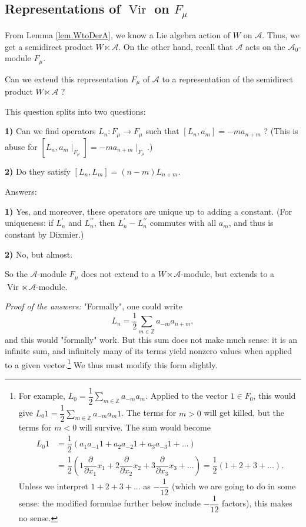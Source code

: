 \documentclass
[numbers=enddot,12pt,final,onecolumn,german,notitlepage]{scrartcl}%
\theoremstyle{definition}
\begin{document}
\subsection{Representations of $\operatorname*{Vir}$ on $F_{\mu}$}

From Lemma \ref{lem.WtoDerA}, we know a Lie algebra action of $W$ on
$\mathcal{A}$. Thus, we get a semidirect product $W\ltimes\mathcal{A}$. On the
other hand, recall that $\mathcal{A}$ acts on the $\mathcal{A}_{0}$-module
$F_{\mu}$.

Can we extend this representation $F_{\mu}$ of $\mathcal{A}$ to a
representation of the semidirect product $W\ltimes\mathcal{A}$ ?

This question splits into two questions:

\textbf{1)} Can we find operators $L_{n}:F_{\mu}\rightarrow F_{\mu}$ such that
$\left[  L_{n},a_{m}\right]  =-ma_{n+m}$ ? (This is abuse for $\left[
L_{n},a_{m}\mid_{F_{\mu}}\right]  =-ma_{n+m}\mid_{F_{\mu}}$.)

\textbf{2)} Do they satisfy $\left[  L_{n},L_{m}\right]  =\left(  n-m\right)
L_{n+m}$.

Answers:

\textbf{1)} Yes, and moreover, these operators are unique up to adding a
constant. (For uniqueness: if $L_{n}^{\prime}$ and $L_{n}^{\prime\prime}$,
then $L_{n}^{\prime}-L_{n}^{\prime\prime}$ commutes with all $a_{m}$, and thus
is constant by Dixmier.)

\textbf{2)} No, but almost.

So the $\mathcal{A}$-module $F_{\mu}$ does not extend to a $W\ltimes
\mathcal{A}$-module, but extends to a $\operatorname*{Vir}\ltimes\mathcal{A}$-module.

\textit{Proof of the answers:} "Formally", one could write
\[
L_{n}=\dfrac{1}{2}\sum\limits_{m\in\mathbb{Z}}a_{-m}a_{n+m},
\]
and this would "formally" work. But this sum does not make much sense: it is
an infinite sum, and infinitely many of its terms yield nonzero values when
applied to a given vector.\footnote{For example, $L_{0}=\dfrac{1}{2}%
\sum\limits_{m\in\mathbb{Z}}a_{-m}a_{m}$. Applied to the vector $1\in F_{0}$,
this would give $L_{0}1=\dfrac{1}{2}\sum\limits_{m\in\mathbb{Z}}a_{-m}a_{m}1$.
The terms for $m>0$ will get killed, but the terms for $m<0$ will survive. The
sum would become
\begin{align*}
L_{0}1  &  =\dfrac{1}{2}\left(  a_{1}a_{-1}1+a_{2}a_{-2}1+a_{3}a_{-3}%
1+...\right) \\
&  =\dfrac{1}{2}\left(  1\dfrac{\partial}{\partial x_{1}}x_{1}+2\dfrac
{\partial}{\partial x_{2}}x_{2}+3\dfrac{\partial}{\partial x_{3}}%
x_{3}+...\right)  =\dfrac{1}{2}\left(  1+2+3+...\right)  .
\end{align*}
Unless we interpret $1+2+3+...$ as $-\dfrac{1}{12}$ (which we are going to do
in some sense: the modified formulae further below include $-\dfrac{1}{12}$
factors), this makes no sense.} We thus must modify this form slightly.
\end{document}
